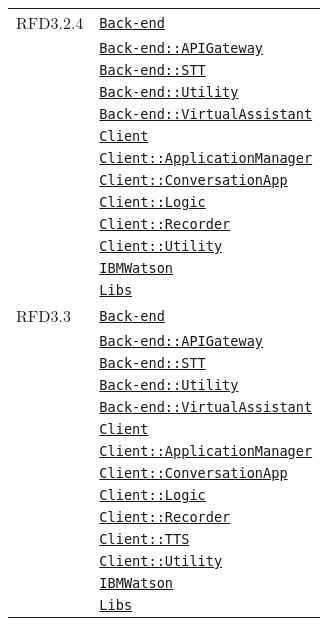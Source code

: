 \begin{longtable}{|>{\centering}m{3cm}|m{10cm}<{\centering}|}
RFD3.2.4 & \hyperref[Back-end]{\texttt{Back-end}}\\
& \hyperref[Back-end::APIGateway]{\texttt{Back-end::APIGateway}}\\
& \hyperref[Back-end::STT]{\texttt{Back-end::STT}}\\
& \hyperref[Back-end::Utility]{\texttt{Back-end::Utility}}\\
& \hyperref[Back-end::VirtualAssistant]{\texttt{Back-end::VirtualAssistant}}\\
& \hyperref[Client]{\texttt{Client}}\\
& \hyperref[Client::ApplicationManager]{\texttt{Client::ApplicationManager}}\\
& \hyperref[Client::ConversationApp]{\texttt{Client::ConversationApp}}\\
& \hyperref[Client::Logic]{\texttt{Client::Logic}}\\
& \hyperref[Client::Recorder]{\texttt{Client::Recorder}}\\
& \hyperref[Client::Utility]{\texttt{Client::Utility}}\\
& \hyperref[IBMWatson]{\texttt{IBMWatson}}\\
& \hyperref[Libs]{\texttt{Libs}}\\ \hline

RFD3.3 & \hyperref[Back-end]{\texttt{Back-end}}\\
& \hyperref[Back-end::APIGateway]{\texttt{Back-end::APIGateway}}\\
& \hyperref[Back-end::STT]{\texttt{Back-end::STT}}\\
& \hyperref[Back-end::Utility]{\texttt{Back-end::Utility}}\\
& \hyperref[Back-end::VirtualAssistant]{\texttt{Back-end::VirtualAssistant}}\\
& \hyperref[Client]{\texttt{Client}}\\
& \hyperref[Client::ApplicationManager]{\texttt{Client::ApplicationManager}}\\
& \hyperref[Client::ConversationApp]{\texttt{Client::ConversationApp}}\\
& \hyperref[Client::Logic]{\texttt{Client::Logic}}\\
& \hyperref[Client::Recorder]{\texttt{Client::Recorder}}\\
& \hyperref[Client::TTS]{\texttt{Client::TTS}}\\
& \hyperref[Client::Utility]{\texttt{Client::Utility}}\\
& \hyperref[IBMWatson]{\texttt{IBMWatson}}\\
& \hyperref[Libs]{\texttt{Libs}}\\ \hline


\end{longtable}
